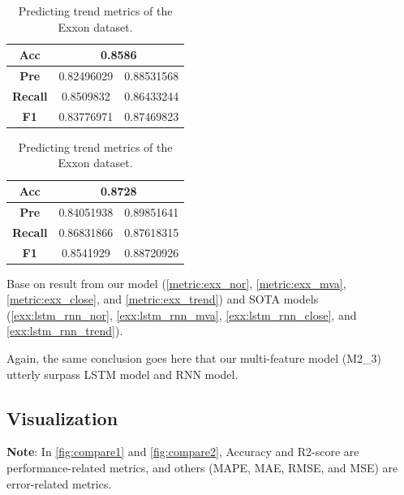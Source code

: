 \begin{table}[H]
	\centering
	\begin{minipage}{0.45\textwidth}
		\centering
		\begin{tabular}{|c|c|c|}
			\hline
			\textbf{Acc}    & \multicolumn{2}{c|}{0.8586} \\
			\hline
			\textbf{Pre}    & 0.82496029                 & 0.88531568 \\
			\hline
			\textbf{Recall} & 0.8509832                  & 0.86433244 \\
			\hline
			\textbf{F1}     & 0.83776971                 & 0.87469823 \\
			\hline
		\end{tabular}
	\end{minipage}
	\begin{minipage}{0.45\textwidth}
		\centering
		\begin{tabular}{|c|c|c|}
			\hline
			\textbf{Acc}    & \multicolumn{2}{c|}{0.8728
			} \\
			\hline
			\textbf{Pre}    & 0.84051938                 & 0.89851641  \\
			\hline
			\textbf{Recall} & 0.86831866                 & 0.87618315 \\
			\hline
			\textbf{F1}     & 0.8541929                 & 0.88720926 \\
			\hline
		\end{tabular}
	\end{minipage}
	\caption{Predicting trend metrics of the Exxon dataset.}
	\label{exx:lstm_rnn_trend}
\end{table}

Base on result from our model (\autoref{metric:exx_nor}, \autoref{metric:exx_mva},
\autoref{metric:exx_close}, and \autoref{metric:exx_trend}) and SOTA models (\autoref{exx:lstm_rnn_nor},
\autoref{exx:lstm_rnn_mva}, \autoref{exx:lstm_rnn_close}, and
\autoref{exx:lstm_rnn_trend}).

Again, the same conclusion goes here that our multi-feature model (M2\_3)
utterly surpass LSTM model and RNN model.

\subsection{Visualization}
\textbf{Note}: In \autoref{fig:compare1} and \autoref{fig:compare2}, Accuracy and R2-score are performance-related metrics, and others (MAPE, MAE, RMSE, and MSE) are error-related metrics.

